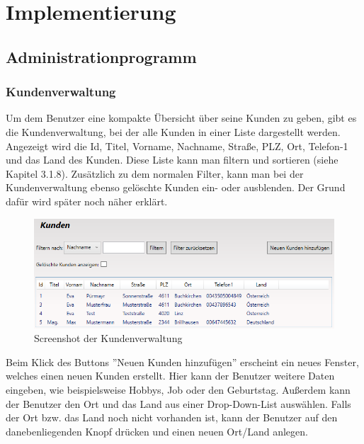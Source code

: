 \chapter{Implementierung}\label{cha:theoretical-background}
\section{Administrationprogramm}
\subsection{Kundenverwaltung}
Um dem Benutzer eine kompakte Übersicht über seine Kunden zu geben, gibt es die Kundenverwaltung, bei der alle Kunden in einer Liste dargestellt werden. Angezeigt wird die Id, Titel, Vorname, Nachname, Straße, PLZ, Ort, Telefon-1 und das Land des Kunden. Diese Liste kann man filtern und sortieren (siehe Kapitel 3.1.8). Zusätzlich zu dem normalen Filter, kann man bei der Kundenverwaltung ebenso gelöschte Kunden ein- oder ausblenden. Der Grund dafür wird später noch näher erklärt.
\begin{figure}[H]
\begin{center}
	\includegraphics[scale=.45]{images/Kunden.png}
\end{center}
	\caption{Screenshot der Kundenverwaltung}
	\label{fig:sample}
\end{figure}
\noindent Beim Klick des Buttons ''Neuen Kunden hinzufügen'' erscheint ein neues Fenster, welches einen neuen Kunden erstellt. Hier kann der Benutzer weitere Daten eingeben, wie beispielsweise Hobbys, Job oder den Geburtstag. Außerdem kann der Benutzer den Ort und das Land aus einer Drop-Down-List auswählen. Falls der Ort bzw. das Land noch nicht vorhanden ist, kann der Benutzer auf den danebenliegenden Knopf drücken und einen neuen Ort/Land anlegen. 
